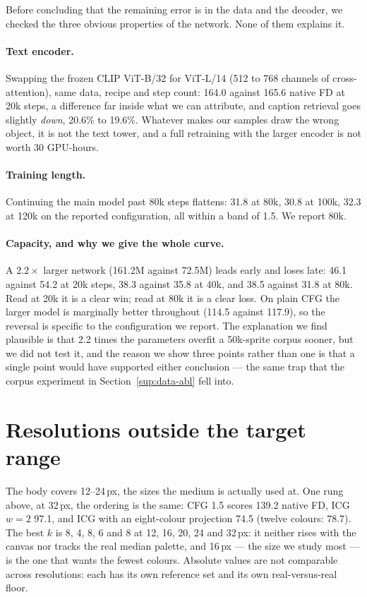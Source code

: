 \documentclass[10pt,twocolumn,letterpaper]{article}
\begin{document}
Before concluding that the remaining error is in the data and the decoder, we checked the three obvious properties of
the network. None of them explains it.

\paragraph{Text encoder.}
Swapping the frozen CLIP ViT-B/32 for ViT-L/14 (512 to 768 channels of cross-attention), same data, recipe and step
count: 164.0 against 165.6 native FD at 20k steps, a difference far inside what we can attribute, and caption
retrieval goes slightly \emph{down}, 20.6\% to 19.6\%. Whatever makes our samples draw the wrong object, it is not the
text tower, and a full retraining with the larger encoder is not worth 30 GPU-hours.

\paragraph{Training length.}
Continuing the main model past 80k steps flattens: 31.8 at 80k, 30.8 at 100k, 32.3 at 120k on the reported
configuration, all within a band of 1.5. We report 80k.

\paragraph{Capacity, and why we give the whole curve.}
A $2.2\times$ larger network (161.2M against 72.5M) leads early and loses late: 46.1 against 54.2 at 20k steps, 38.3
against 35.8 at 40k, and 38.5 against 31.8 at 80k. Read at 20k it is a clear win; read at 80k it is a clear loss. On
plain CFG the larger model is marginally better throughout (114.5 against 117.9), so the reversal is specific to the
configuration we report. The explanation we find plausible is that 2.2 times the parameters overfit a 50k-sprite corpus
sooner, but we did not test it, and the reason we show three points rather than one is that a single point would have
supported either conclusion --- the same trap that the corpus experiment in Section~\ref{sup:data-abl} fell into.

\section{Resolutions outside the target range}
\label{sup:res32}

The body covers 12--24\,px, the sizes the medium is actually used at. One rung above, at 32\,px, the ordering is the
same: CFG 1.5 scores 139.2 native FD, ICG $w{=}2$ 97.1, and ICG with an eight-colour projection 74.5 (twelve colours:
78.7). The best $k$ is 8, 4, 8, 6 and 8 at 12, 16, 20, 24 and 32\,px: it neither rises with the canvas nor tracks the real
median palette, and 16\,px --- the size we study most --- is the one that wants the fewest colours. Absolute values are not comparable across resolutions: each has
its own reference set and its own real-versus-real floor.
\end{document}
